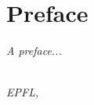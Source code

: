 \chapter*{Preface}

\emph{A preface...}

\begin{flushright}
{\makeatletter\itshape
    \@author \\
    EPFL, \monthname{} \the\year{}
\makeatother}
\end{flushright}
